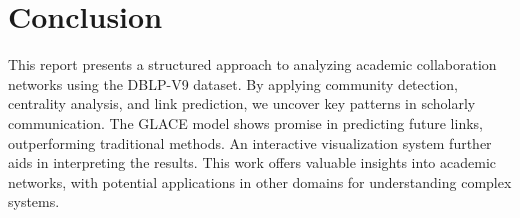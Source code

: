 \documentclass[11pt]{article}
\begin{document}
\section{Conclusion}

This report presents a structured approach to analyzing academic collaboration networks using the DBLP-V9 dataset. By applying community detection, centrality analysis, and link prediction, we uncover key patterns in scholarly communication. The GLACE model shows promise in predicting future links, outperforming traditional methods. An interactive visualization system further aids in interpreting the results. This work offers valuable insights into academic networks, with potential applications in other domains for understanding complex systems.




% 
% 



\end{document}
